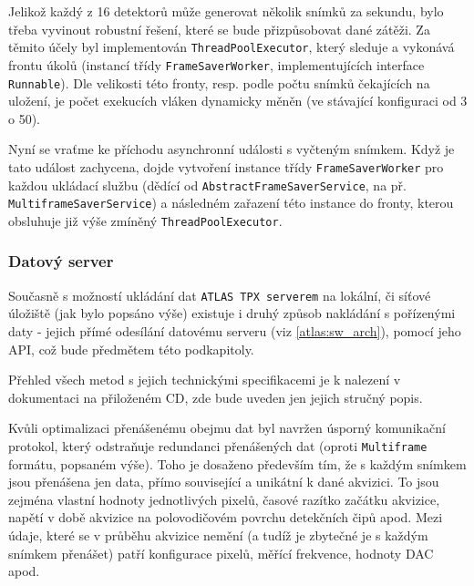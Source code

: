 Jelikož každý z 16 detektorů může generovat několik snímků za sekundu, bylo třeba vyvinout robustní řešení, které se bude přizpůsobovat dané zátěži. Za těmito účely byl implementován \texttt{ThreadPoolExecutor}, který sleduje a vykonává frontu úkolů (instancí třídy \texttt{FrameSaverWorker}, implementujících interface \texttt{Runnable}). Dle velikosti této fronty, resp. podle počtu snímků čekajících na uložení, je počet exekucích vláken dynamicky měněn (ve stávající konfiguraci od 3 o 50). 

Nyní se vraťme ke příchodu asynchronní události s vyčteným snímkem. Když je tato událost zachycena, dojde vytvoření instance třídy \texttt{FrameSaverWorker} pro každou ukládací službu (dědící od \texttt{AbstractFrameSaverService}, na př. \texttt{MultiframeSaverService}) a následném zařazení této instance do fronty, kterou obsluhuje již výše zmíněný \texttt{ThreadPoolExecutor}.


\subsubsection{Datový server}\label{atlas:cont:output:dataserver}
Současně s možností ukládání dat \texttt{ATLAS TPX serverem} na lokální, či síťové úložiště (jak bylo popsáno výše) existuje i druhý způsob nakládání s pořízenými daty - jejich přímé odesílání datovému serveru (viz \ref{atlas:sw_arch}), pomocí jeho API, což bude předmětem této podkapitoly.

Přehled všech metod s jejich technickými specifikacemi je k nalezení v dokumentaci na přiloženém CD, zde bude uveden jen jejich stručný popis.

Kvůli optimalizaci přenášenému obejmu dat byl navržen úsporný komunikační protokol, který odstraňuje redundanci přenášených dat (oproti \texttt{Multiframe} formátu, popsaném výše). Toho je dosaženo především tím, že s každým snímkem jsou přenášena jen data, přímo související a unikátní k dané akvizici. To jsou zejména vlastní hodnoty jednotlivých pixelů, časové razítko začátku akvizice, napětí v době akvizice na polovodičovém povrchu detekčních čipů apod. Mezi údaje, které se v průběhu akvizice nemění (a tudíž je zbytečné je s každým snímkem přenášet) patří konfigurace pixelů, měřící frekvence, hodnoty DAC apod.

